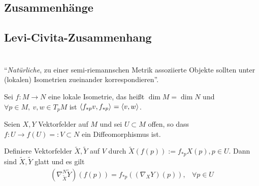 \documentclass{skript}
\begin{document}

\subsection{Zusammenhänge}

\subsection{Levi-Civita-Zusammenhang}

\section{}
"`\emph{Natürliche}, zu einer semi-riemannschen Metrik assoziierte Objekte sollten
unter (lokalen) Isometrien zueinander korrespondieren"'.

Sei $f:M\to N$ eine lokale Isometrie, das heißt $\dim M = \dim N$ und $\forall
p\in M,\ v,w\in T_pM$ ist $\sprod{f_{*p}v, f_{*p}} = \sprod{v,w}$.

Seien $X,Y$ Vektorfelder auf $M$ und sei $U\subset M$ offen, so dass $f:U\to
f(U) =: V \subset N$ ein Diffeomorphismus ist.

Definiere Vektorfelder $\tilde X, \tilde Y$ auf $V$ durch $\tilde X\left( f(p)
\right) := f_{*p}X(p), p\in U$. Dann sind $\tilde X, \tilde Y$ glatt und es gilt
\begin{align*}
  \left( \nabla_{\tilde X}^N\tilde Y \right)(f(p)) = f_{*p}\left(  \left(
  \nabla_XY \right)(p) \right), & \forall p\in U
\end{align*}
\end{document}
